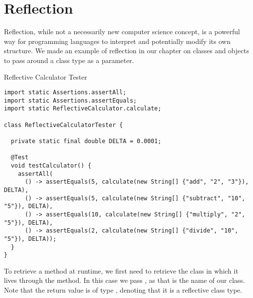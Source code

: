 \section{Reflection}

Reflection, while not a necessarily new computer science concept, is a powerful way for programming languages to interpret and potentially modify its own structure. We made an example of reflection in our chapter on classes and objects to pass around a class type as a parameter. 


\begin{cl}[]{Reflective Calculator Tester}
\begin{lstlisting}[language=MyJava]
import static Assertions.assertAll;
import static Assertions.assertEquals;
import static ReflectiveCalculator.calculate;

class ReflectiveCalculatorTester {

  private static final double DELTA = 0.0001;

  @Test
  void testCalculator() {
    assertAll(
      () -> assertEquals(5, calculate(new String[] {"add", "2", "3"}), DELTA),
      () -> assertEquals(5, calculate(new String[] {"subtract", "10", "5"}), DELTA),
      () -> assertEquals(10, calculate(new String[] {"multiply", "2", "5"}), DELTA),
      () -> assertEquals(2, calculate(new String[] {"divide", "10", "5"}), DELTA));
  }
}
\end{lstlisting}
\end{cl}

To retrieve a method at runtime, we first need to retrieve the class in which it lives through the  method. In this case we pass , as that is the name of our class. Note that the return value is of type , denoting that it is a reflective class type.

